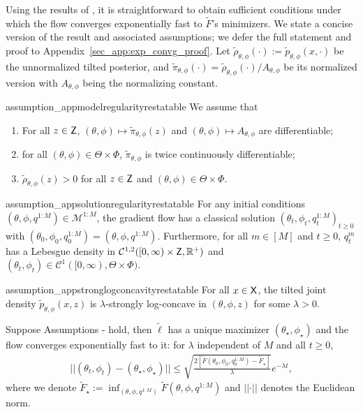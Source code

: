\documentclass[twoside]{article}
\begin{document}
Using the results of \cite{caprioerrorboundsparticle2024}, it is straightforward to obtain sufficient conditions under which the flow converges exponentially fast to $\tilde{F}$'s minimizers. We state a concise version of the result and associated assumptions; we defer the full statement and proof to Appendix~\ref{sec_app:exp_convg_proof}. Let $\tilde{\rho}_{\theta,\phi}(\cdot):=\tilde p_{\theta,\phi}(x, \cdot)$ be the unnormalized tilted posterior, and $\tilde{\pi}_{\theta,\phi}(\cdot) = \tilde\rho_{\theta,\phi}(\cdot)/A_{\theta, \phi}$ be its normalized version with $A_{\theta, \phi}$ being the normalizing constant.
\begin{restatable}{assumption_app}{modelregularityrestatable}\label{assump:model_reg}
    We assume that
    \begin{enumerate}
        \item For all $z \in {\mathsf{Z}}$, $(\theta,\phi) \mapsto \tilde\pi_{\theta,\phi}(z)$ and $(\theta, \phi) \mapsto A_{\theta, \phi}$ are differentiable;
        \item for all $(\theta,\phi) \in \Theta \times \Phi$, $\tilde\pi_{\theta,\phi}$ is twice continuously differentiable;
        \item $\tilde{\rho}_{\theta,\phi}(z)>0$ for all $z\in {\mathsf{Z}}$ and $(\theta,\phi) \in \Theta \times \Phi$.
    \end{enumerate}
\end{restatable}
\begin{restatable}{assumption_app}{solutionregularityrestatable}\label{assump:solution_reg}
    For any initial conditions $(\theta, \phi, q^{1:M})\in \mathcal{M}^{1:M}$,  the gradient flow has a classical solution $(\theta_t, \phi_t,  q_t^{1:M})_{t \geq 0}$ with $(\theta_0, \phi_0, q_0^{1:M}) = (\theta, \phi, q^{1:M})$.  
Furthermore, for all $m\in [M]$ and $t \geq 0$, $q_t^m$ has a Lebesgue density in $\mathcal{C}^{1,2}([0, \infty) \times {\mathsf{Z}}, \mathbb{R}^+)$ and $(\theta_t, \phi_t) \in \mathcal{C}^1([0, \infty), \Theta \times \Phi)$.
\end{restatable}
\begin{restatable}{assumption_app}{stronglogconcavityrestatable}\label{assump:strong_log_concave}
    For all $x\in {\mathsf{X}}$, the tilted joint density $\tilde{p}_{\theta, \phi}(x,z)$ is $\lambda$-strongly log-concave in $(\theta, \phi, z)$ for some $\lambda>0$.
\end{restatable}
\begin{theorem}\label{thm:exp_convg_informal}
Suppose Assumptions - hold, then $\tilde{\ell}$ has a unique maximizer $(\theta_\star, \phi_\star)$ and the flow converges exponentially fast to it: for $\lambda$ independent of $M$ and all $t\geq 0$, 
\begin{align*}
        \vert\vert(\theta_t,\phi_t)-(\theta_\star,\phi_\star) \vert\vert
        \leq
        \sqrt{\frac{2[\tilde{F}(\theta_0, \phi_0, q_0^{1:M})-\tilde{F}_\star]}{\lambda}}e^{-\lambda t},
\end{align*}
where we denote $\tilde{F}_\star:=\inf_{(\theta,\phi,q^{1:M})}\tilde{F}(\theta,\phi,q^{1:M})$ and $\vert\vert\cdot\vert\vert$ denotes the Euclidean norm.
\end{theorem}
\end{document}
